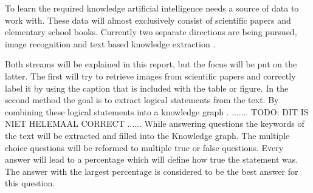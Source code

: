 To learn the required knowledge artificial intelligence needs a source of data to work with.
These data will almost exclusively consist of scientific papers and elementary school books. 
Currently two separate directions are being pursued, image recognition \cite{pdffigures2} and text based knowledge extraction \cite{probseman,sciencequestions}.

Both streams will be explained in this report, but the focus will be put on the latter.
The first will try to retrieve images from scientific papers and correctly label it by using the caption that is included with the table or figure.
In the second method the goal is to extract logical statements from the text. By combining these logical statements into a knowledge graph  \cite{construction}.
....... TODO: DIT IS NIET HELEMAAL CORRECT ......
While answering questions the keywords of the text will be extracted and filled into the Knowledge graph.
The multiple choice questions will be reformed to multiple true or false questions. 
Every answer will lead to a percentage which will define how true the statement was.
The answer with the largest percentage is considered to be the best answer for this question.

